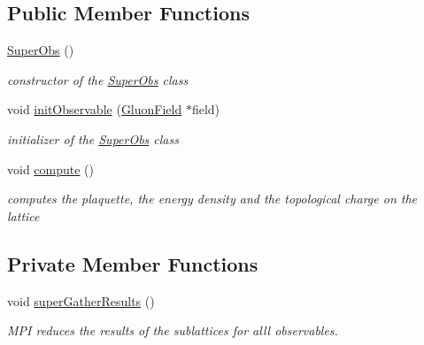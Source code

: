 \subsection*{Public Member Functions}
\begin{DoxyCompactItemize}
\item 
\hyperlink{classSuperObs_a0d9dae0074c21180ca0d08d97fe0cab6}{Super\+Obs} ()\hypertarget{classSuperObs_a0d9dae0074c21180ca0d08d97fe0cab6}{}\label{classSuperObs_a0d9dae0074c21180ca0d08d97fe0cab6}

\begin{DoxyCompactList}\small\item\em constructor of the \hyperlink{classSuperObs}{Super\+Obs} class \end{DoxyCompactList}\item 
void \hyperlink{classSuperObs_a292660868f04e6afc8c1300ec6fca5cc}{init\+Observable} (\hyperlink{field_8h_afe80b127697eba6d6e7fbd8121c8d4ee}{Gluon\+Field} $\ast$field)\hypertarget{classSuperObs_a292660868f04e6afc8c1300ec6fca5cc}{}\label{classSuperObs_a292660868f04e6afc8c1300ec6fca5cc}

\begin{DoxyCompactList}\small\item\em initializer of the \hyperlink{classSuperObs}{Super\+Obs} class \end{DoxyCompactList}\item 
void \hyperlink{classSuperObs_a84e5e240fca5bdab31046fa87805456d}{compute} ()\hypertarget{classSuperObs_a84e5e240fca5bdab31046fa87805456d}{}\label{classSuperObs_a84e5e240fca5bdab31046fa87805456d}

\begin{DoxyCompactList}\small\item\em computes the plaquette, the energy density and the topological charge on the lattice \end{DoxyCompactList}\end{DoxyCompactItemize}
\subsection*{Private Member Functions}
\begin{DoxyCompactItemize}
\item 
void \hyperlink{classSuperObs_a24f0e5e87655af0c44d041fc332db1e7}{super\+Gather\+Results} ()\hypertarget{classSuperObs_a24f0e5e87655af0c44d041fc332db1e7}{}\label{classSuperObs_a24f0e5e87655af0c44d041fc332db1e7}

\begin{DoxyCompactList}\small\item\em M\+PI reduces the results of the sublattices for alll observables. \end{DoxyCompactList}\end{DoxyCompactItemize}

